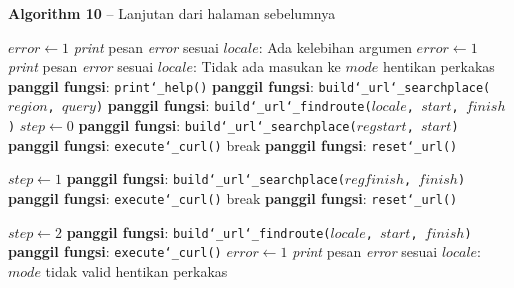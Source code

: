 \begin{algorithm}[h]
	\begin{center}
		\textbf{Algorithm 10} -- Lanjutan dari halaman sebelumnya
	\end{center}
	\begin{algorithmic}
			\State $error \gets 1$
			\State \textit{print} pesan \textit{error} sesuai $locale$: Ada kelebihan argumen
		\Else
					\State $error \gets 1$
					\State \textit{print} pesan \textit{error} sesuai $locale$: Tidak ada masukan ke $mode$
					\State hentikan perkakas
				\EndCase
					\State \textbf{panggil fungsi}: \texttt{print\char`_help()}
				\EndCase
					\State \textbf{panggil fungsi}: \texttt{build\char`_url\char`_searchplace($region$, $query$)}
				\EndCase
					\State \textbf{panggil fungsi}: \texttt{build\char`_url\char`_findroute($locale$, $start$, $finish$)}
				\EndCase
					\State $step \gets 0$
					\State \textbf{panggil fungsi}: \texttt{build\char`_url\char`_searchplace($regstart$, $start$)}
					\State \textbf{panggil fungsi}: \texttt{execute\char`_curl()}
						\State break
					\Else
						\State \textbf{panggil fungsi}: \texttt{reset\char`_url()}
					\EndIf
					
					\State $step \gets 1$
					\State \textbf{panggil fungsi}: \texttt{build\char`_url\char`_searchplace($regfinish$, $finish$)}
					\State \textbf{panggil fungsi}: \texttt{execute\char`_curl()}
						\State break
					\Else
						\State \textbf{panggil fungsi}: \texttt{reset\char`_url()}
					\EndIf
					
					\State $step \gets 2$
					\State \textbf{panggil fungsi}: \texttt{build\char`_url\char`_findroute($locale$, $start$, $finish$)}
					\State \textbf{panggil fungsi}: \texttt{execute\char`_curl()}
				\EndCase
				\Default
					\State $error \gets 1$
					\State \textit{print} pesan \textit{error} sesuai $locale$: $mode$ tidak valid
					\State hentikan perkakas
				\EndCase
			\EndSwitch
		\EndIf
		
	\end{algorithmic}
\end{algorithm}
